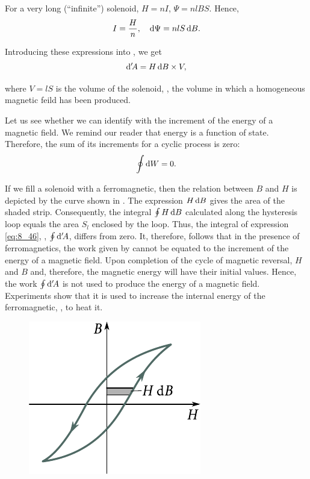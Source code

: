 For a very long (``infinite'') solenoid, $H=nI$, $\Psi=nlBS$.
Hence,
\begin{equation*}
	I = \frac{H}{n},\quad \mathrm{d}\Psi = nlS\, \mathrm{d} B.
\end{equation*}

\noindent
Introducing these expressions into , we get
\begin{equation}\label{eq:8_46}
	\mathrm{d}'\!A = H\, \mathrm{d} B \times V,
\end{equation}

\noindent
where $V=lS$ is the volume of the solenoid, \ie, the volume in which a homogeneous magnetic feild has been produced.

Let us see whether we can identify  with the increment of the energy of a magnetic field.
We remind our reader that energy is a function of state.
Therefore, the sum of its increments for a cyclic process is zero:
\begin{equation*}
	\oint \mathrm{d} W = 0.
\end{equation*}

\noindent
If we fill a solenoid with a ferromagnetic, then the relation between $B$ and $H$ is depicted by the curve shown in .
The expression $H\,\mathrm{d} B$ gives the area of the shaded strip.
Consequently, the integral $\oint H\,\mathrm{d} B$ calculated along the hysteresis loop equals the area $S_l$ enclosed by the loop.
Thus, the integral of expression \eqref{eq:8_46}, \ie, $\oint\mathrm{d}'\!A$, differs from zero.
It, therefore, follows that in the presence of ferromagnetics, the work given by  cannot
be equated to the increment of the energy of a magnetic field.
Upon completion of the cycle of magnetic reversal, $H$ and $B$ and, therefore, the magnetic energy will have their initial values.
Hence, the work $\oint\mathrm{d}'\!A$ is not used to produce the energy of a magnetic field.
Experiments show that it is used to increase the internal energy of the ferromagnetic, \ie, to heat it.

\begin{figure}[t]
	\begin{center}
		\includegraphics[scale=1]{figures/ch_08/fig_8_12.pdf}
		\caption[]{}
		\label{fig:8_12}
	\end{center}
	\vspace{-0.8cm}
\end{figure}

